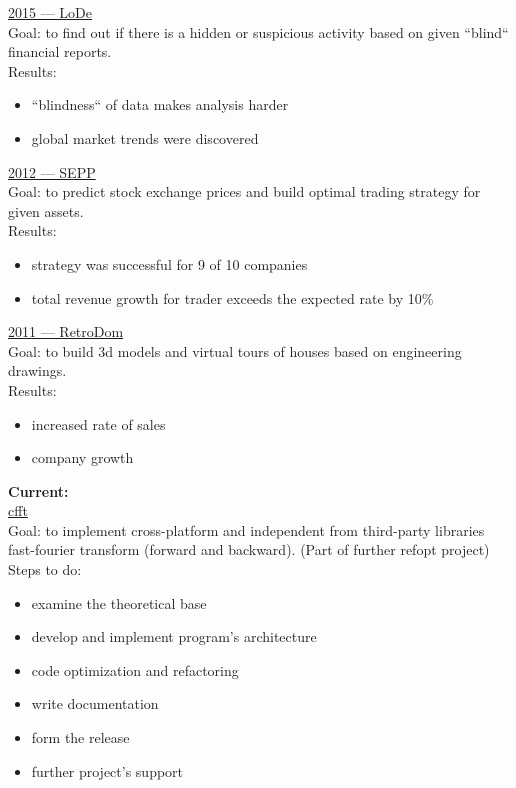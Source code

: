\documentclass[a4paper,12pt,fullpage]{article}
\begin{document}
\underline{2015 --- LoDe}\\
Goal: to find out if there is a hidden or suspicious activity  based on given 
``blind`` financial reports.\\
Results:
\begin{itemize}
	\item ``blindness`` of data makes analysis harder
	\item global market trends were discovered\\
\end{itemize}

\underline{2012 --- SEPP}\\
Goal: to predict stock exchange prices and build optimal trading strategy for 
given assets.\\
Results: 
\begin{itemize}
	\item strategy was successful for 9 of 10 companies
	\item total revenue growth for trader exceeds the expected rate by 10\%\\
\end{itemize}


\underline{2011 --- RetroDom}\\
Goal: to build 3d models and virtual tours of houses based on engineering 
drawings.\\
Results: 
\begin{itemize}
	\item increased rate of sales
	\item company growth\\
\end{itemize}

\textbf{Current:}\\
\underline{cfft}\\
Goal: to implement cross-platform and independent from third-party libraries 
fast-fourier transform (forward and backward). (Part of further refopt project)\\
Steps to do:
\begin{itemize}
	\item examine the theoretical base
	\item develop and implement program's architecture
	\item code optimization and refactoring
	\item write documentation
	\item form the release
	\item further project's support\\
\end{itemize}
\end{document}
